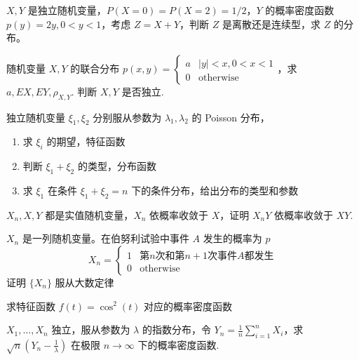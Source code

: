 \begin{problem}
$X,Y$ 是独立随机变量，$P(X=0)=P(X=2)=1/2$，$Y$ 的概率密度函数 $p(y)=2y,0<y<1$，考虑 $Z=X+Y$，判断 $Z$ 是离散还是连续型，求 $Z$ 的分布。
\end{problem}

\begin{problem}
随机变量 $X,Y$ 的联合分布 $p(x,y)=\begin{cases}a& \lvert y \rvert<x,0<x<1\\ 0& \text{otherwise}\end{cases}$，求 $a,EX,EY,\rho_{X,Y}$. 判断 $X,Y$ 是否独立.
\end{problem}

\begin{problem}
独立随机变量 $\xi_{1},\xi_{2}$ 分别服从参数为 $\lambda_{1},\lambda_{2}$ 的 Poisson 分布，
\begin{enumerate}
    \item 求 $\xi _{i}$ 的期望，特征函数
    \item 判断 $\xi_{1}+\xi_{2}$ 的类型，分布函数
    \item 求 $\xi_{1}$ 在条件 $\xi_{1}+\xi_{2}=n$ 下的条件分布，给出分布的类型和参数
\end{enumerate}
\end{problem}

\begin{problem}
$X_{n},X,Y$ 都是实值随机变量，$X_{n}$ 依概率收敛于 $X$，证明 $X_{n}Y$ 依概率收敛于 $XY$.
\end{problem}

\begin{problem}
$X_{n}$ 是一列随机变量。在伯努利试验中事件 $A$ 发生的概率为 $p$ 
$$
X_{n}=\left\{\begin{array}{ll}
1 & \text{第}n\text{次和第}n+1\text{次事件}A\text{都发生} \\
0 & \text{otherwise}
\end{array}\right.
$$
证明 $\{ X_{n} \}$ 服从大数定律
\end{problem}

\begin{problem}
求特征函数 $f(t)=\cos ^{2} (t)$ 对应的概率密度函数
\end{problem}

\begin{problem}
$X_{1},\dots,X_{n}$ 独立，服从参数为 $\lambda$ 的指数分布，令 $Y_{n}=\frac{1}{n}\sum_{i=1}^{n}X_{i}$，求 $\sqrt{ n }\left( Y_{n}-\frac{1}{\lambda} \right)$ 在极限 $n\to \infty$ 下的概率密度函数.
\end{problem}

